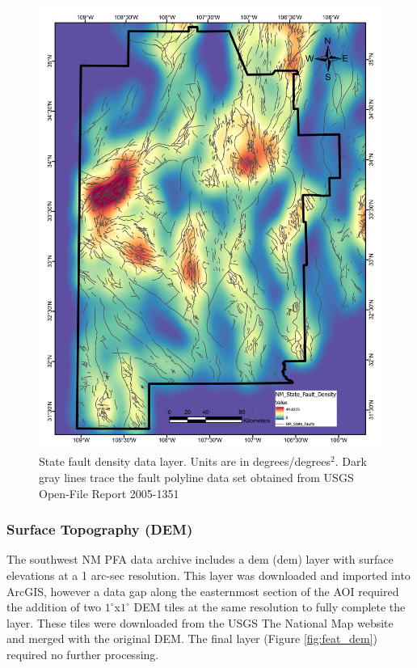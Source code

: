 \begin{figure}[!htp]
\centering
\includegraphics[scale=.50]{templates/images/Figure-StateFaultDensity.pdf}
\caption[State fault density data layer]{State fault density data layer. Units are in degrees/degrees$^2$. Dark gray lines trace the fault polyline data set obtained from USGS Open-File Report 2005-1351 \protect\citep{stoeser_new_2005}}
\label{fig:state_faults}
\end{figure}

\subsubsection{Surface Topography (DEM)}

The southwest NM PFA data archive \citep{kelley_geothermal_2015} includes a \acrlong{dem} (\acrshort{dem}) layer with surface elevations at a 1 arc-sec resolution. This layer was downloaded and imported into ArcGIS, however a data gap along the easternmost section of the AOI required the addition of two $1^\circ$x$1^\circ$ DEM tiles at the same resolution to fully complete the layer. These tiles were downloaded from the USGS The National Map website \citep{usgs_tnm_2021} and merged with the original DEM. The final layer (Figure \ref{fig:feat_dem}) required no further processing.

